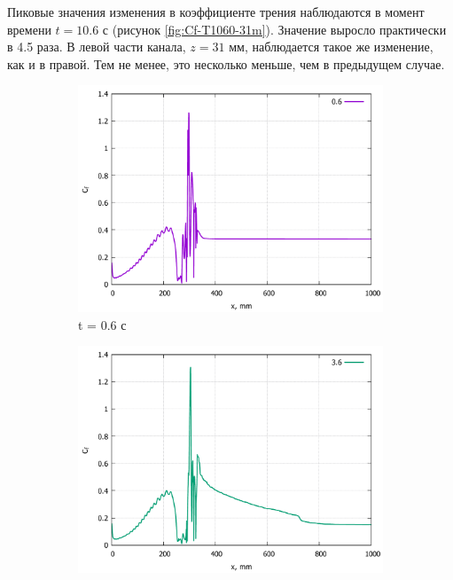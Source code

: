 	Пиковые значения изменения в коэффициенте трения наблюдаются в момент времени $t = 10.6$ с (рисунок \ref{fig:Cf-T1060-31m}). Значение выросло практически в 4.5 раза.
	\newpage
	В левой части канала, $z = 31$ мм, наблюдается такое же изменение, как и в правой. Тем не менее, это несколько меньше, чем в предыдущем случае.
	\begin{figure}[H]
		\begin{subfigure}{.5\textwidth}
			\centering
			\includegraphics[width=1\linewidth]{../Assets/Cf-T06-31p}
			\caption{t = 0.6 с}
			\label{fig:Cf-T06-31p}
		\end{subfigure}%
		\begin{subfigure}{.5\textwidth}
			\centering
			\includegraphics[width=1\linewidth]{../Assets/Cf-T360-31p}

\end{subfigure}
\end{figure}
